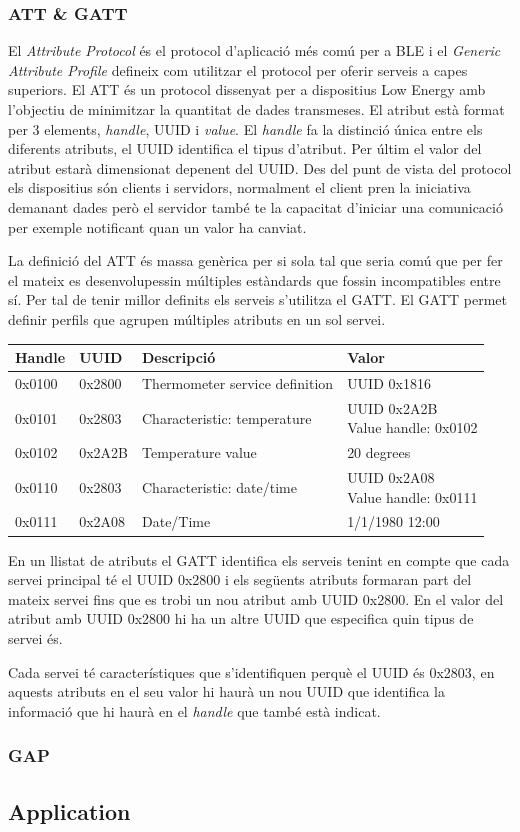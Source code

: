 \subsubsection{ATT \& GATT}
El \textit{Attribute Protocol} és el protocol d'aplicació més comú per a BLE i el \textit{Generic Attribute Profile} defineix com utilitzar el protocol per oferir serveis a capes superiors.
El ATT és un protocol dissenyat per a dispositius Low Energy amb l'objectiu de minimitzar la quantitat de dades transmeses. El atribut està format per 3 elements, \textit{handle}, UUID  i \textit{value}. El \textit{handle} fa la distinció única entre els diferents atributs, el UUID identifica el tipus d'atribut. Per últim el valor del atribut estarà dimensionat depenent del UUID.
Des del punt de vista del protocol els dispositius són clients i servidors, normalment el client pren la iniciativa demanant dades però el servidor també te la capacitat d'iniciar una comunicació per exemple notificant quan un valor ha canviat.

La definició del ATT és massa genèrica per si sola tal que seria comú que per fer el mateix es desenvolupessin múltiples estàndards que fossin incompatibles entre sí.
Per tal de tenir millor definits els serveis s'utilitza el GATT. El GATT permet definir perfils que agrupen múltiples atributs en un sol servei.
\begin{center}
	\begin{tabular}{|l|l|l|l|}
		\hline
		Handle	&	UUID	&	Descripció						&	Valor		\\ 	\hline
		0x0100	&	0x2800	&	Thermometer service definition	&	UUID 0x1816	\\		\hline
		0x0101	&	0x2803	&	Characteristic: temperature		&	\parbox[t]{4cm}{UUID 0x2A2B	\\ Value handle: 0x0102}	\\	\hline
		0x0102	&	0x2A2B	&	Temperature value				&	20 degrees	\\	\hline
		0x0110	&	0x2803	&	Characteristic: date/time		&	\parbox[t]{4cm}{UUID 0x2A08	\\ Value handle: 0x0111}	\\		\hline
		0x0111	&	0x2A08	&	Date/Time						&	1/1/1980 12:00	\\
		\hline
	\end{tabular}
\end{center}


En un llistat de atributs el GATT identifica els serveis tenint en compte que cada servei principal té el UUID 0x2800 i els següents atributs formaran part del mateix servei fins que es trobi un nou atribut amb UUID 0x2800. En el valor del atribut amb UUID 0x2800 hi ha un altre UUID que especifica quin tipus de servei és.

Cada servei té característiques que s'identifiquen perquè el UUID és 0x2803, en aquests atributs en el seu valor hi haurà un nou UUID que identifica la informació que hi haurà en el \textit{handle} que també està indicat.
\subsubsection{GAP}
\subsection{Application}

